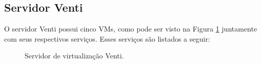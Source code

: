 \subsection{Servidor Venti}
\label{section:serv_venti}

O servidor Venti possui cinco \ac{VM}s, como pode ser visto na Figura \ref{fig:servidor_venti} juntamente com seus respectivos serviços. 
Esses serviços são listados a seguir:

\begin{figure}[h!]
 \centering
 \caption{Servidor de virtualização Venti.}
 \label{fig:servidor_venti}
\end{figure}


